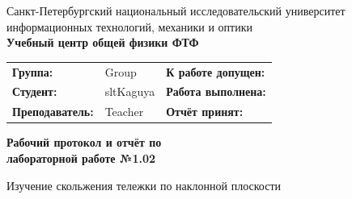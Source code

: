 \documentclass[12pt]{article}
\begin{document}
\begin{center}
    \hfill \break
    \hfill \break
    Санкт-Петербургский национальный исследовательский университет \\
    информационных технологий, механики и оптики \\
    \textbf{Учебный центр общей физики ФТФ} \\
    \vspace{12pt}
    \begin{tabular}[l]{m{} m{} m{}}
        \hline
        \textbf{Группа:} & Group & \textbf{К работе допущен:} \\
        \textbf{Студент:} & sltKaguya & \textbf{Работа выполнена:} \\
        \textbf{Преподаватель:} & Teacher & \textbf{Отчёт принят:}
    \end{tabular} \break
    \hfill \break
    \Large{\textbf{Рабочий протокол и отчёт по \\
    лабораторной работе №1.02}} \break
    
    \large{Изучение скольжения тележки по наклонной плоскости\\}\hfill
\end{center}
\end{document}
